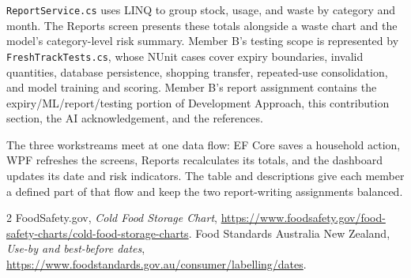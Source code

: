 \documentclass[11pt,a4paper]{article}
\begin{document}
\texttt{ReportService.cs} uses LINQ to group stock, usage, and waste by category and month. The Reports screen presents these totals alongside a waste chart and the model's category-level risk summary. Member B's testing scope is represented by \texttt{FreshTrackTests.cs}, whose NUnit cases cover expiry boundaries, invalid quantities, database persistence, shopping transfer, repeated-use consolidation, and model training and scoring. Member B's report assignment contains the expiry/ML/report/testing portion of Development Approach, this contribution section, the AI acknowledgement, and the references.

The three workstreams meet at one data flow: EF Core saves a household action, WPF refreshes the screens, Reports recalculates its totals, and the dashboard updates its date and risk indicators. The table and descriptions give each member a defined part of that flow and keep the two report-writing assignments balanced.

\renewcommand{\refname}{References}
\begin{thebibliography}{2}
 FoodSafety.gov, \emph{Cold Food Storage Chart}, \url{https://www.foodsafety.gov/food-safety-charts/cold-food-storage-charts}.
 Food Standards Australia New Zealand, \emph{Use-by and best-before dates}, \url{https://www.foodstandards.gov.au/consumer/labelling/dates}.
\end{thebibliography}
\end{document}
